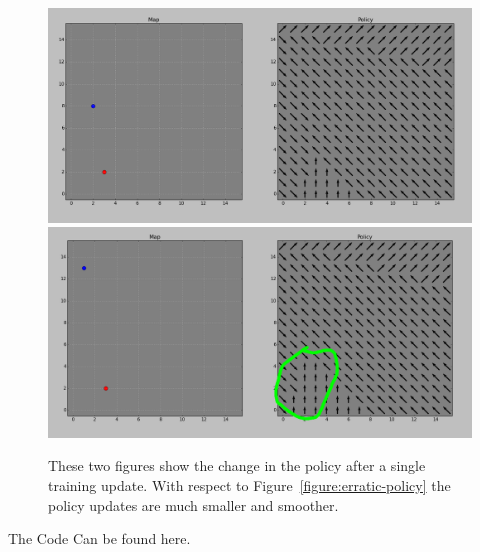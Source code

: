 \begin{figure}
	\centering
	\label{figure:smooth-policy}
	\includegraphics[width=0.9\linewidth]{../images/before_policyJump-lower-learningRate.png}
	\includegraphics[width=0.9\linewidth]{../images/after_policyJump-lower-learningRate.png}
	\caption{These two figures show the change in the policy after a single training update. 
	With respect to Figure~\ref{figure:erratic-policy} the policy updates are much smaller and smoother.}
\end{figure}

The Code 
Can be found here.


